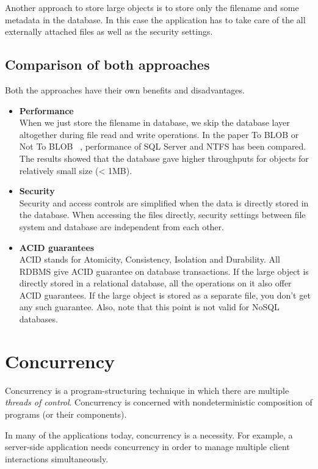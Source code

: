 Another approach to store large objects is to store only the filename and some metadata in the database. In this case the application has to take care of the all externally attached files as well as the security settings.

\subsection{Comparison of both approaches}
Both the approaches have their own benefits and disadvantages.

\begin{itemize}
  \item{\textbf{Performance}} \\
    When we just store the filename in database, we skip the database layer altogether during file read and write operations. In the paper To BLOB or Not To BLOB ~\cite{sears2007blob}, performance of SQL Server and NTFS has been compared. The results showed that the database gave higher throughputs for objects for relatively small size (< 1MB).

  \item{\textbf{Security}} \\
    Security and access controls are simplified when the data is directly stored in the database. When accessing the files directly, security settings between file system and database are independent from each other.

  \item{\textbf{ACID guarantees}} \\
    ACID stands for Atomicity, Consistency, Isolation and Durability. All RDBMS give ACID guarantee on database transactions. If the large object is directly stored in a relational database, all the operations on it also offer ACID guarantees. If the large object is stored as a separate file, you don't get any such guarantee. Also, note that this point is not valid for NoSQL databases.
\end{itemize}

\section{Concurrency}
Concurrency is a program-structuring technique in which there are multiple \textit{threads of control}. Concurrency is concerned with nondeterministic composition of programs (or their components).

In many of the applications today, concurrency is a necessity. For example, a server-side application needs concurrency in order to manage multiple client interactions simultaneously.

